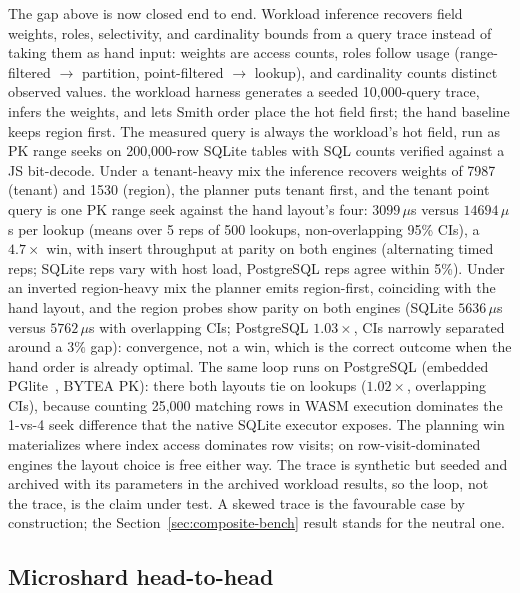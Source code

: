\documentclass{svproc}
\begin{document}
The gap above is now closed end to end. Workload inference recovers
field weights, roles, selectivity, and cardinality bounds from a query trace
instead of taking them as hand input: weights are access counts, roles follow
usage (range-filtered $\to$ partition, point-filtered $\to$ lookup), and
cardinality counts distinct observed values. the workload harness
generates a seeded 10{,}000-query trace, infers the weights, and lets Smith
order place the hot field first; the hand baseline keeps region first. The
measured query is always the workload's hot field, run as PK range seeks on
200{,}000-row SQLite tables with SQL counts verified against a JS bit-decode.
Under a tenant-heavy mix the inference recovers weights of 7987 (tenant) and
1530 (region), the planner puts tenant first, and the tenant point query is one
PK range seek against the hand layout's four:
$3099\,\mu$s versus $14694\,\mu$s per lookup (means over 5 reps of 500
lookups, non-overlapping 95\% CIs), a $4.7\times$ win, with insert throughput
at parity on both engines (alternating timed reps; SQLite reps vary with host
load, PostgreSQL reps agree within 5\%). Under an inverted region-heavy mix the planner emits region-first,
coinciding with the hand layout, and the region probes show parity on both
engines (SQLite $5636\,\mu$s versus $5762\,\mu$s with overlapping CIs;
PostgreSQL $1.03\times$, CIs narrowly separated around a $3\%$ gap): convergence, not a win, which is the correct outcome when
the hand order is already optimal. The same loop runs on PostgreSQL (embedded PGlite~\cite{23}, BYTEA PK):
there both layouts tie on lookups ($1.02\times$, overlapping CIs), because
counting 25{,}000 matching rows in WASM execution dominates the 1-vs-4 seek
difference that the native SQLite executor exposes. The planning win
materializes where index access dominates row visits; on row-visit-dominated
engines the layout choice is free either way. The trace is synthetic but seeded and archived with its parameters
in the archived workload results, so the loop, not the trace,
is the claim under test. A skewed trace is the favourable case by
construction; the Section~\ref{sec:composite-bench} result stands for the
neutral one.

\subsection{Microshard head-to-head}
\label{sec:microshard}
\end{document}
